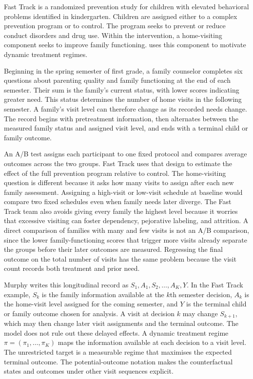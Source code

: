 Fast Track is a randomized prevention study for children with elevated behavioral problems identified in kindergarten. Children are assigned either to a complex prevention program or to control. The program seeks to prevent or reduce conduct disorders and drug use. Within the intervention, a home-visiting component seeks to improve family functioning. \citet{murphy2003dtr} uses this component to motivate dynamic treatment regimes.

Beginning in the spring semester of first grade, a family counselor completes six questions about parenting quality and family functioning at the end of each semester. Their sum is the family's current status, with lower scores indicating greater need. This status determines the number of home visits in the following semester. A family's visit level can therefore change as its recorded needs change. The record begins with pretreatment information, then alternates between the measured family status and assigned visit level, and ends with a terminal child or family outcome.

An A/B test assigns each participant to one fixed protocol and compares average outcomes across the two groups. Fast Track uses that design to estimate the effect of the full prevention program relative to control. The home-visiting question is different because it asks how many visits to assign after each new family assessment. Assigning a high-visit or low-visit schedule at baseline would compare two fixed schedules even when family needs later diverge. The Fast Track team also avoids giving every family the highest level because it worries that excessive visiting can foster dependency, pejorative labeling, and attrition. A direct comparison of families with many and few visits is not an A/B comparison, since the lower family-functioning scores that trigger more visits already separate the groups before their later outcomes are measured. Regressing the final outcome on the total number of visits has the same problem because the visit count records both treatment and prior need.

Murphy writes this longitudinal record as $S_1,A_1,S_2,\ldots,A_K,Y$. In the Fast Track example, $S_k$ is the family information available at the $k$th semester decision, $A_k$ is the home-visit level assigned for the coming semester, and $Y$ is the terminal child or family outcome chosen for analysis. A visit at decision $k$ may change $S_{k+1}$, which may then change later visit assignments and the terminal outcome. The model does not rule out these delayed effects. A dynamic treatment regime $\pi=(\pi_1,\ldots,\pi_K)$ maps the information available at each decision to a visit level. The unrestricted target is a measurable regime that maximises the expected terminal outcome. The potential-outcome notation makes the counterfactual states and outcomes under other visit sequences explicit.


